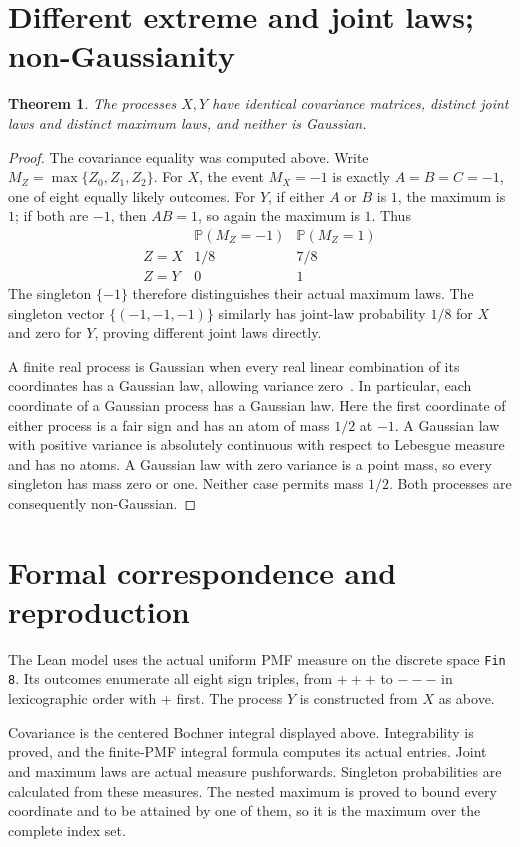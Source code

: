 \documentclass[10pt]{article}
\newtheorem{theorem}{Theorem}
\newcommand{\Prb}{\mathbb P}
\begin{document}
\clearpage
\section{Different extreme and joint laws; non-Gaussianity}
\begin{theorem}
The processes $X,Y$ have identical covariance matrices, distinct joint laws and distinct maximum laws, and neither is Gaussian.
\end{theorem}
\begin{proof}
The covariance equality was computed above. Write $M_Z=\max\{Z_0,Z_1,Z_2\}$. For $X$, the event $M_X=-1$ is exactly $A=B=C=-1$, one of eight equally likely outcomes. For $Y$, if either $A$ or $B$ is $1$, the maximum is $1$; if both are $-1$, then $AB=1$, so again the maximum is $1$. Thus
\[
\begin{array}{c|cc}
 & \Prb(M_Z=-1) & \Prb(M_Z=1) \\ \hline
 Z=X & 1/8 & 7/8 \\
 Z=Y & 0 & 1
\end{array}
\]
The singleton $\{-1\}$ therefore distinguishes their actual maximum laws. The singleton vector $\{(-1,-1,-1)\}$ similarly has joint-law probability $1/8$ for $X$ and zero for $Y$, proving different joint laws directly.

A finite real process is Gaussian when every real linear combination of its coordinates has a Gaussian law, allowing variance zero~\cite[\S2.3.4]{gardner}. In particular, each coordinate of a Gaussian process has a Gaussian law. Here the first coordinate of either process is a fair sign and has an atom of mass $1/2$ at $-1$. A Gaussian law with positive variance is absolutely continuous with respect to Lebesgue measure and has no atoms. A Gaussian law with zero variance is a point mass, so every singleton has mass zero or one. Neither case permits mass $1/2$. Both processes are consequently non-Gaussian.
\end{proof}

\section{Formal correspondence and reproduction}
The Lean model uses the actual uniform PMF measure on the discrete space \texttt{Fin 8}. Its outcomes enumerate all eight sign triples, from $+++$ to $---$ in lexicographic order with $+$ first. The process $Y$ is constructed from $X$ as above.

Covariance is the centered Bochner integral displayed above. Integrability is proved, and the finite-PMF integral formula computes its actual entries. Joint and maximum laws are actual measure pushforwards. Singleton probabilities are calculated from these measures. The nested maximum is proved to bound every coordinate and to be attained by one of them, so it is the maximum over the complete index set.
\end{document}
